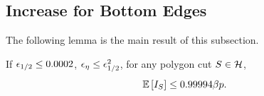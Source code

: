 	
%


\subsection{Increase for Bottom Edges}\label{sub:polycutincrease}

The following lemma is the main result of this subsection.
\begin{lemma}\label{cor:botincrease}
If ${\epsilon}_{1/2}\leq 0.0002$, ${\epsilon}_{\eta} \leq {\epsilon}_{1/2}^2$, for any polygon cut $S\in\mathcal{H}$,
$${\mathbb{E}}\left[I_{S}\right] \le 0.99994 \beta p.$$	
\end{lemma}
